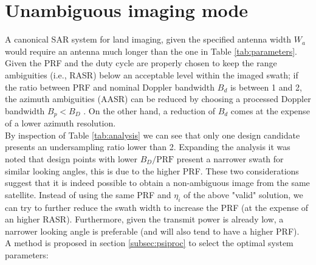 \documentclass[conference,a4paper]{IEEEtran}
\begin{document}
    \section{Unambiguous imaging mode}
    \label{sec:psi}
    A canonical SAR system for land imaging, given the specified antenna width $W_a$ would require an antenna much longer than the one in Table \ref{tab:parameters}.
    Given the PRF and the duty cycle are properly chosen to keep the range ambiguities (i.e., RASR) below an acceptable level within the imaged swath;
    if the ratio between PRF and nominal Doppler bandwidth $B_d$ is between 1 and 2, the azimuth ambiguities (AASR) can be reduced by choosing a processed Doppler bandwidth $B_p < B_D$  \cite{freeman2018design}.
    On the other hand, a reduction of $B_d$ comes at the expense of a lower azimuth resolution.\\
    By inspection of Table \ref{tab:analysis} we can see that only one design candidate presents an undersampling ratio lower than 2.
    Expanding the analysis it was noted that design points with lower $B_D/\text{PRF}$ present a narrower swath for similar looking angles, this is due to the higher PRF.
    These two considerations suggest that it is indeed possible to obtain a non-ambiguous image from the same satellite.
    Instead of using the same PRF and $\eta_i$ of the above "valid" solution, we can try to further reduce the swath width to increase the PRF (at the expense of an higher RASR).
    Furthermore, given the transmit power is already low, a narrower looking angle is preferable (and will also tend to have a higher PRF).\\
    A method is proposed in section \ref{subsec:psiproc} to select the optimal system parameters:
\end{document}
